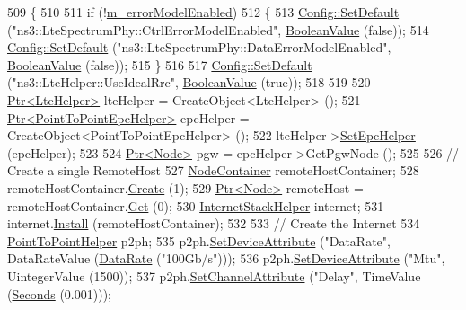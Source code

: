 \begin{DoxyCode}
509 \{
510 
511   \textcolor{keywordflow}{if} (!\hyperlink{classLenaCqaFfMacSchedulerTestCase2_a517e6364b00e790263dea8601cc2c766}{m\_errorModelEnabled})
512     \{
513       \hyperlink{group__config_ga2e7882df849d8ba4aaad31c934c40c06}{Config::SetDefault} (\textcolor{stringliteral}{"ns3::LteSpectrumPhy::CtrlErrorModelEnabled"}, 
      \hyperlink{classns3_1_1BooleanValue}{BooleanValue} (\textcolor{keyword}{false}));
514       \hyperlink{group__config_ga2e7882df849d8ba4aaad31c934c40c06}{Config::SetDefault} (\textcolor{stringliteral}{"ns3::LteSpectrumPhy::DataErrorModelEnabled"}, 
      \hyperlink{classns3_1_1BooleanValue}{BooleanValue} (\textcolor{keyword}{false}));
515     \}
516 
517   \hyperlink{group__config_ga2e7882df849d8ba4aaad31c934c40c06}{Config::SetDefault} (\textcolor{stringliteral}{"ns3::LteHelper::UseIdealRrc"}, 
      \hyperlink{classns3_1_1BooleanValue}{BooleanValue} (\textcolor{keyword}{true}));
518 
519 
520   \hyperlink{classns3_1_1Ptr}{Ptr<LteHelper>} lteHelper = CreateObject<LteHelper> ();
521   \hyperlink{classns3_1_1Ptr}{Ptr<PointToPointEpcHelper>}  epcHelper = CreateObject<PointToPointEpcHelper> ();
522   lteHelper->\hyperlink{classns3_1_1LteHelper_a324079a1ccd54ce949786b83d6b95915}{SetEpcHelper} (epcHelper);
523 
524   \hyperlink{classns3_1_1Ptr}{Ptr<Node>} pgw = epcHelper->GetPgwNode ();
525 
526   \textcolor{comment}{// Create a single RemoteHost}
527   \hyperlink{classns3_1_1NodeContainer}{NodeContainer} remoteHostContainer;
528   remoteHostContainer.\hyperlink{classns3_1_1NodeContainer_a787f059e2813e8b951cc6914d11dfe69}{Create} (1);
529   \hyperlink{classns3_1_1Ptr}{Ptr<Node>} remoteHost = remoteHostContainer.\hyperlink{classns3_1_1NodeContainer_a9ed96e2ecc22e0f5a3d4842eb9bf90bf}{Get} (0);
530   \hyperlink{classns3_1_1InternetStackHelper}{InternetStackHelper} internet;
531   internet.\hyperlink{classns3_1_1InternetStackHelper_a6645b412f31283d2d9bc3d8a95cebbc0}{Install} (remoteHostContainer);
532 
533   \textcolor{comment}{// Create the Internet}
534   \hyperlink{classns3_1_1PointToPointHelper}{PointToPointHelper} p2ph;
535   p2ph.\hyperlink{classns3_1_1PointToPointHelper_a4577f5ab8c387e5528af2e0fbab1152e}{SetDeviceAttribute} (\textcolor{stringliteral}{"DataRate"}, DataRateValue (\hyperlink{classns3_1_1DataRate}{DataRate} (\textcolor{stringliteral}{"100Gb/s"})));
536   p2ph.\hyperlink{classns3_1_1PointToPointHelper_a4577f5ab8c387e5528af2e0fbab1152e}{SetDeviceAttribute} (\textcolor{stringliteral}{"Mtu"}, UintegerValue (1500));
537   p2ph.\hyperlink{classns3_1_1PointToPointHelper_a6b5317fd17fb61e5a53f8d66a90b63b9}{SetChannelAttribute} (\textcolor{stringliteral}{"Delay"}, TimeValue (\hyperlink{group__timecivil_ga33c34b816f8ff6628e33d5c8e9713b9e}{Seconds} (0.001)));

\end{DoxyCode}
